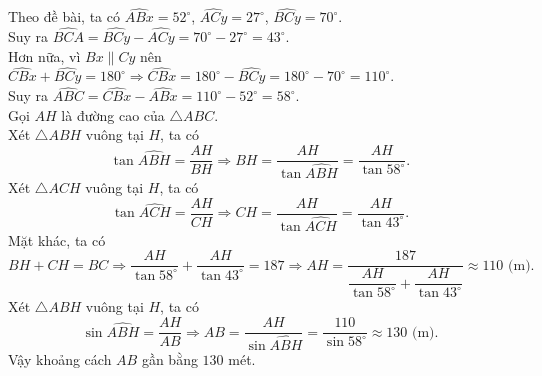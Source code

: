 \begin{bt}
{\begin{center}
	\end{center}
	Theo đề bài, ta có $\widehat{ABx} = 52^\circ$, $\widehat{ACy} = 27^\circ$, $\widehat{BCy} = 70^\circ$.\\
	Suy ra $\widehat{BCA} = \widehat{BCy} - \widehat{ACy} = 70^\circ - 27^\circ = 43^\circ$.\\
	Hơn nữa, vì $Bx \parallel Cy$ nên $\widehat{CBx} + \widehat{BCy} = 180^\circ \Rightarrow \widehat{CBx} = 180^\circ - \widehat{BCy} = 180^\circ - 70^\circ = 110^\circ$.\\
	Suy ra $\widehat{ABC} = \widehat{CBx} - \widehat{ABx} = 110^\circ - 52^\circ = 58^\circ$.\\
	Gọi $AH$ là đường cao của $\triangle ABC$.\\ 
	Xét $\triangle ABH$ vuông tại $H$, ta có
	$$ \tan \widehat{ABH} = \dfrac{AH}{BH} \Rightarrow BH = \dfrac{AH}{\tan\widehat{ABH}} = \dfrac{AH}{\tan 58^\circ}. $$
	Xét $\triangle ACH$ vuông tại $H$, ta có
	$$ \tan \widehat{ACH} = \dfrac{AH}{CH} \Rightarrow CH = \dfrac{AH}{\tan\widehat{ACH}} = \dfrac{AH}{\tan 43^\circ}. $$
	Mặt khác, ta có
	$$ BH + CH = BC \Rightarrow \dfrac{AH}{\tan 58^\circ} + \dfrac{AH}{\tan 43^\circ} = 187 \Rightarrow AH = \dfrac{187}{\dfrac{AH}{\tan 58^\circ} + \dfrac{AH}{\tan 43^\circ}} \approx 110 \textrm{ (m).} $$
	Xét $\triangle ABH$ vuông tại $H$, ta có
	$$ \sin\widehat{ABH} = \dfrac{AH}{AB} \Rightarrow AB = \dfrac{AH}{\sin\widehat{ABH}} = \dfrac{110}{\sin 58^\circ} \approx 130 \textrm{ (m).} $$
	Vậy khoảng cách $AB$ gần bằng $130$ mét.
	}
\end{bt}
